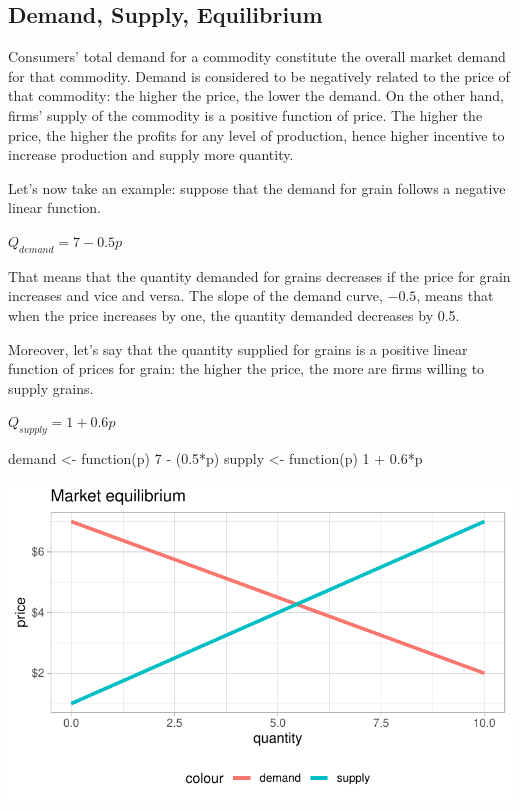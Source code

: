 \documentclass[
  letterpaper,
  DIV=11,
  numbers=noendperiod]{scrreprt}
\newenvironment{Shaded}{\begin{snugshade}}{\end{snugshade}}
\newcommand{\ControlFlowTok}[1]{\textcolor[rgb]{0.00,0.23,0.31}{#1}}
\newcommand{\DecValTok}[1]{\textcolor[rgb]{0.68,0.00,0.00}{#1}}
\newcommand{\FloatTok}[1]{\textcolor[rgb]{0.68,0.00,0.00}{#1}}
\newcommand{\NormalTok}[1]{\textcolor[rgb]{0.00,0.23,0.31}{#1}}
\newcommand{\OtherTok}[1]{\textcolor[rgb]{0.00,0.23,0.31}{#1}}
\newcommand{\SpecialCharTok}[1]{\textcolor[rgb]{0.37,0.37,0.37}{#1}}
\begin{document}
\hypertarget{demand-supply-equilibrium}{%
\subsection{Demand, Supply,
Equilibrium}\label{demand-supply-equilibrium}}

Consumers' total demand for a commodity constitute the overall market
demand for that commodity. Demand is considered to be negatively related
to the price of that commodity: the higher the price, the lower the
demand. On the other hand, firms' supply of the commodity is a positive
function of price. The higher the price, the higher the profits for any
level of production, hence higher incentive to increase production and
supply more quantity.

Let's now take an example: suppose that the demand for grain follows a
negative linear function.

\(Q_{demand} = 7-0.5p\)

That means that the quantity demanded for grains decreases if the price
for grain increases and vice and versa. The slope of the demand curve,
\(-0.5\), means that when the price increases by one, the quantity
demanded decreases by 0.5.

Moreover, let's say that the quantity supplied for grains is a positive
linear function of prices for grain: the higher the price, the more are
firms willing to supply grains.

\(Q_{supply} = 1+0.6p\)

\begin{Shaded}
\begin{Highlighting}[]
\NormalTok{demand }\OtherTok{\textless{}{-}} \ControlFlowTok{function}\NormalTok{(p) }\DecValTok{7} \SpecialCharTok{{-}}\NormalTok{ (}\FloatTok{0.5}\SpecialCharTok{*}\NormalTok{p)}
\NormalTok{supply }\OtherTok{\textless{}{-}} \ControlFlowTok{function}\NormalTok{(p) }\DecValTok{1} \SpecialCharTok{+} \FloatTok{0.6}\SpecialCharTok{*}\NormalTok{p}
\end{Highlighting}
\end{Shaded}

\includegraphics{intro_files/figure-pdf/unnamed-chunk-3-1.pdf}
\end{document}
